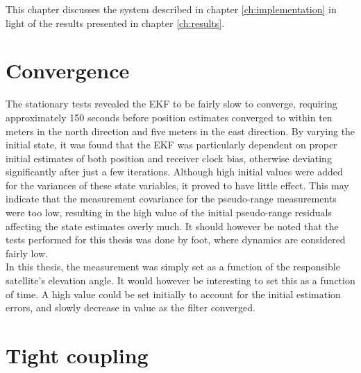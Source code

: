 
This chapter discusses the system described in chapter \ref{ch:implementation} in light of the results presented in chapter \ref{ch:results}.
\section{Convergence}
    The stationary tests revealed the EKF to be fairly slow to converge, requiring approximately 150 seconds before position estimates converged to within ten meters in the north direction and five meters in the east direction. By varying the initial state, it was found that the EKF was particularly dependent on proper initial estimates of both position and receiver clock bias, otherwise deviating significantly after just a few iterations. Although high initial values were added for the variances of these state variables, it proved to have little effect. This may indicate that the measurement covariance for the pseudo-range measurements were too low, resulting in the high value of the initial pseudo-range residuals affecting the state estimates overly much. It should however be noted that the tests performed for this thesis was done by foot, where dynamics are considered fairly low. \\ 
        
    In this thesis, the measurement was simply set as a function of the responsible satellite's elevation angle. It would however be interesting to set this as a function of time. A high value could be set initially to account for the initial estimation errors, and slowly decrease in value as the filter converged.\\
        
        
        
\section{Tight coupling}
    
